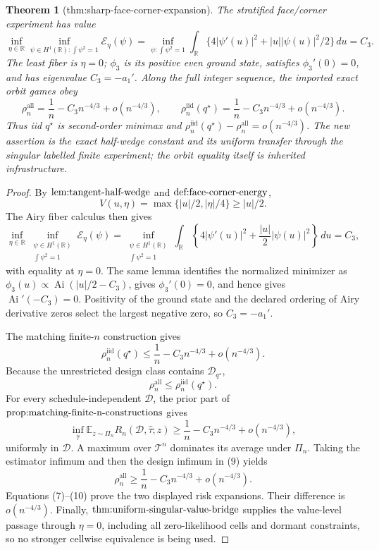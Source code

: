 \documentclass{article}
\newtheorem{theorem}{Theorem}
\begin{document}
\begin{theorem}[thm:sharp-face-corner-expansion]\label{thm:sharp-face-corner-expansion}
The stratified face/corner experiment has value \[\inf_{\eta\in\mathbb R}\inf_{\psi\in H^1(\mathbb R):\int\psi^2=1}\mathcal E_\eta(\psi)=\inf_{\psi:\int\psi^2=1}\int_{\mathbb R}\{4|\psi'(u)|^2+|u||\psi(u)|^2/2\}\,du=C_3.\] The least fiber is \(\eta=0\); \(\phi_3\) is its positive even ground state, satisfies \(\phi_3'(0)=0\), and has eigenvalue \(C_3=-a_1'\). Along the full integer sequence, the imported exact orbit games obey \[\rho_n^{\mathrm{all}}=\frac1n-C_3n^{-4/3}+o(n^{-4/3}),\qquad \rho_n^{\mathrm{iid}}(q^\star)=\frac1n-C_3n^{-4/3}+o(n^{-4/3}).\] Thus iid \(q^\star\) is second-order minimax and \(\rho_n^{\mathrm{iid}}(q^\star)-\rho_n^{\mathrm{all}}=o(n^{-4/3})\). The new assertion is the exact half-wedge constant and its uniform transfer through the singular labelled finite experiment; the orbit equality itself is inherited infrastructure.
\end{theorem}
\begin{proof}
By \(\textnormal{lem:tangent-half-wedge}\) and \(\textnormal{def:face-corner-energy}\),
\[
V(u,\eta)=\max\{|u|/2,|\eta|/4\}\geq |u|/2.
\]
The Airy fiber calculus then gives
\[
\inf_{\eta\in\mathbb R}\inf_{\substack{\psi\in H^1(\mathbb R)\\ \int\psi^2=1}}
\mathcal E_\eta(\psi)
=\inf_{\substack{\psi\in H^1(\mathbb R)\\ \int\psi^2=1}}
\int_{\mathbb R}\left\{4|\psi'(u)|^2+\frac{|u|}{2}|\psi(u)|^2\right\}\,du
=C_3,
\]
with equality at \(\eta=0\).  The same lemma identifies the normalized minimizer as \(\phi_3(u)\propto\operatorname{Ai}(|u|/2-C_3)\), gives \(\phi_3'(0)=0\), and hence gives \(\operatorname{Ai}'(-C_3)=0\).  Positivity of the ground state and the declared ordering of Airy derivative zeros select the largest negative zero, so \(C_3=-a_1'\).

The matching finite-\(n\) construction gives
\[
\rho_n^{\mathrm{iid}}(q^\star)
\leq \frac1n-C_3n^{-4/3}+o(n^{-4/3}).
\tag{7}
\]
Because the unrestricted design class contains \(\mathcal D_{q^\star}\),
\[
\rho_n^{\mathrm{all}}\leq\rho_n^{\mathrm{iid}}(q^\star).
\tag{8}
\]
For every schedule-independent \(\mathcal D\), the prior part of \(\textnormal{prop:matching-finite-n-constructions}\) gives
\[
\inf_{\widehat\tau}\mathbb E_{z\sim\Pi_n}
R_n(\mathcal D,\widehat\tau;z)
\geq \frac1n-C_3n^{-4/3}+o(n^{-4/3}),
\tag{9}
\]
uniformly in \(\mathcal D\).  A maximum over \(\mathcal T^n\) dominates its average under \(\Pi_n\).  Taking the estimator infimum and then the design infimum in (9) yields
\[
\rho_n^{\mathrm{all}}
\geq \frac1n-C_3n^{-4/3}+o(n^{-4/3}).
\tag{10}
\]
Equations (7)--(10) prove the two displayed risk expansions.  Their difference is \(o(n^{-4/3})\).  Finally, \(\textnormal{thm:uniform-singular-value-bridge}\) supplies the value-level passage through \(\eta=0\), including all zero-likelihood cells and dormant constraints, so no stronger cellwise equivalence is being used.
\end{proof}
\end{document}
